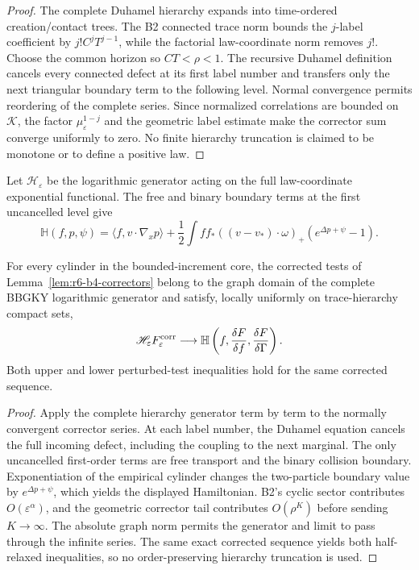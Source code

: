 \begin{proof}
The complete Duhamel hierarchy expands into time-ordered creation/contact
trees.  The B2 connected trace norm bounds the \(j\)-label coefficient by
\(j!C^jT^{j-1}\), while the factorial law-coordinate norm removes \(j!\).
Choose the common horizon so \(CT<\rho<1\).  The recursive Duhamel definition
cancels every connected defect at its first label number and transfers only
the next triangular boundary term to the following level.  Normal convergence
permits reordering of the complete series.  Since normalized correlations are
bounded on \(\mathcal K\), the factor
\(\mu_\varepsilon^{1-j}\) and the geometric label estimate make the corrector
sum converge uniformly to zero.  No finite hierarchy truncation is claimed to
be monotone or to define a positive law.
\end{proof}

Let \(\mathscr H_\varepsilon\) be the logarithmic generator acting on the
full law-coordinate exponential functional.  The free and binary boundary
terms at the first uncancelled level give
\[
\mathbb H(f,p,\psi)=
\langle f,v\cdot\nabla_xp\rangle+
\frac12\int ff_*((v-v_*)\cdot\omega)_+
\left(e^{\Delta p+\psi}-1\right).
\]

\begin{theorem}
\label{thm:r6-b4-generator}
For every cylinder in the bounded-increment core, the corrected tests of
Lemma~\ref{lem:r6-b4-correctors} belong to the graph domain of the complete
BBGKY logarithmic generator and satisfy, locally uniformly on trace-hierarchy
compact sets,
\[
\mathscr H_\varepsilon F_\varepsilon^{\rm corr}
\longrightarrow
\mathbb H\left(f,\frac{\delta F}{\delta f},
\frac{\delta F}{\delta\Gamma}\right).
\]
Both upper and lower perturbed-test inequalities hold for the same corrected
sequence.
\end{theorem}

\begin{proof}
Apply the complete hierarchy generator term by term to the normally convergent
corrector series.  At each label number, the Duhamel equation cancels the full
incoming defect, including the coupling to the next marginal.  The only
uncancelled first-order terms are free transport and the binary collision
boundary.  Exponentiation of the empirical cylinder changes the two-particle
boundary value by
\(e^{\Delta p+\psi}\), which yields the displayed Hamiltonian.  B2's cyclic
sector contributes \(O(\varepsilon^\alpha)\), and the geometric corrector tail
contributes \(O(\rho^K)\) before sending \(K\to\infty\).  The absolute graph
norm permits the generator and limit to pass through the infinite series.
The same exact corrected sequence yields both half-relaxed inequalities, so
no order-preserving hierarchy truncation is used.
\end{proof}

